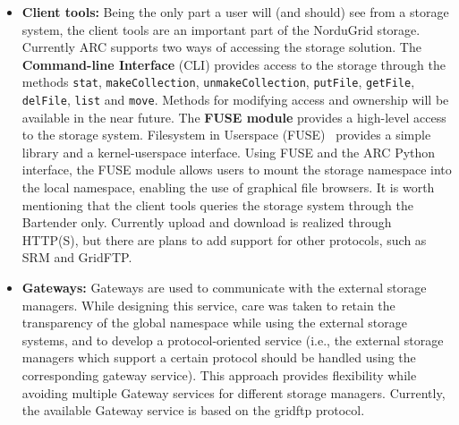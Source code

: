 \documentclass{llncs}
\begin{document}
\begin{itemize}
\item \textbf{Client tools:} Being the only part a user will (and should) see from a storage
system, the client tools are an important part of the NorduGrid storage. Currently ARC supports two ways of accessing the
storage solution. The \textbf{Command-line Interface} (CLI) provides
  access to the storage through the methods \texttt{stat}, \texttt{makeCollection},
  \texttt{unmakeCollection}, \texttt{putFile}, \texttt{getFile}, \texttt{delFile},
  \texttt{list} and \texttt{move}. Methods for modifying
  access and ownership will be available in the near future.
The \textbf{FUSE module} provides a high-level access to the
  storage system. Filesystem in Userspace (FUSE)~\cite{FUSE} provides a simple
  library and a kernel-userspace interface. Using FUSE and the ARC
  Python interface, the FUSE module allows users to mount the
  storage namespace into the local namespace, enabling the use of
  graphical file browsers. 
It is worth mentioning that the client tools queries the storage system
through the Bartender only. Currently upload and download is realized
through HTTP(S), but there are plans to add support for other
protocols, such as SRM and GridFTP.

\item \textbf{Gateways:} Gateways are used to communicate with the external storage
managers. While designing this service, care was taken to 
retain the transparency of the global namespace while using the external storage systems,
and to develop a protocol-oriented  service (i.e., the external
  storage managers which support a certain protocol should be handled
  using the corresponding gateway service).  
This approach provides flexibility while avoiding multiple Gateway
services for different storage managers. Currently, the available
Gateway service is based on the gridftp protocol.  


\end{itemize}
\end{document}
